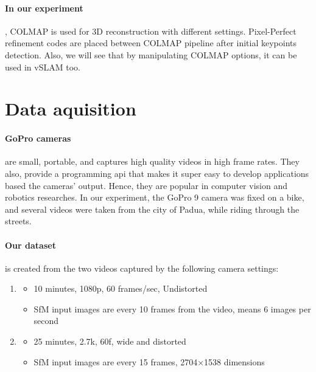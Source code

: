 \documentclass[11pt]{article}
\begin{document}
    \paragraph{In our experiment}, COLMAP is used for 3D reconstruction with different settings. Pixel-Perfect
    refinement codes are placed between COLMAP pipeline after initial keypoints detection. Also, we will see that
    by manipulating COLMAP options, it can be used in vSLAM too.

    \newpage
    \section{Data aquisition}

    \paragraph{GoPro cameras} are small, portable, and captures high quality videos in high frame rates. They also, provide
    a programming api that makes it super easy to develop applications based the cameras' output. Hence, they
    are popular in computer vision and robotics researches. In our experiment, the GoPro 9 camera was fixed on
    a bike, and several videos were taken from the city of Padua, while riding through the streets.

    \paragraph{Our dataset} is created from the two videos captured by the following camera settings:

    \begin{enumerate}
        \item
        \begin{itemize}
            \item 10 minutes, 1080p, 60 frames/sec, Undistorted
            \item SfM input images are every 10 frames from the video, means 6 images per second
        \end{itemize}
        \item
        \begin{itemize}
            \item 25 minutes, 2.7k, 60f, wide and distorted
            \item SfM input images are every 15 frames, 2704×1538 dimensions
        \end{itemize}
    \end{enumerate}
\end{document}
